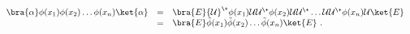 \begin{equation}
  \label{eq:free12}
  \begin{array}{lcl}
    \bra{\alpha}\phi(x_1) \phi(x_2) \ldots \phi(x_n)\ket{\alpha} &=&
    \bra{E}{\cal U}^\+
    \phi(x_1) {\cal U}{\cal U}^\+\phi(x_2){\cal U} {\cal U}^\+\ldots {\cal U}{\cal 
U}^\+\phi(x_n)
    {\cal U}\ket{E}\\
    &=&
    \bra{E}\tilde\phi(x_1) \tilde\phi(x_2) \ldots \tilde\phi(x_n)\ket{E}~.
  \end{array}
\end{equation}

